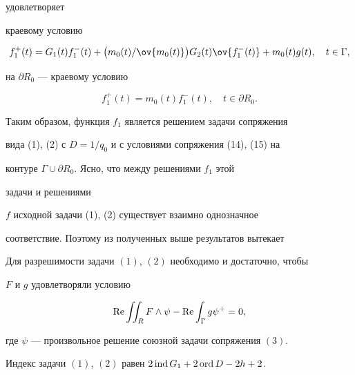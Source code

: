 удовлетворяет 


краевому условию 


\begin{equation} 


f^+_1(t)=G_1(t)f^-_1(t)+\big(m_0(t)/\ov{m_0(t)}\big) 


G_2(t)\ov{f^-_1(t)}+m_0(t)g(t),\quad t\in\Gamma, 


\end{equation} 


на $\partial R_0$ --- краевому условию 


\begin{equation} 


f^+_1(t)=m_0(t)f^-_1(t),\quad t\in\partial R_0. 


\end{equation} 


Таким образом, функция $f_1$ является решением задачи сопряжения 


вида (1), (2) с $D=1/q_0$ и с условиями сопряжения (14), (15) на 


контуре $\Gamma\cup\partial R_0$. Ясно, что между решениями $f_1$ этой 


задачи и решениями 


$f$ исходной задачи (1), (2) существует взаимно однозначное 


соответствие. Поэтому из полученных выше результатов вытекает 


 


\begin{thmnonum} 


Для разрешимости задачи $(1)$, $(2)$ необходимо и достаточно, чтобы 


$F$ и $g$ удовлетворяли условию 


$$ 


\re\iint_R F\wedge\psi-\re\int_\Gamma g\psi^+=0, 


$$ 


где $\psi$ --- произвольное решение союзной задачи сопряжения $(3)$. 


Индекс задачи $(1)$, $(2)$ равен $2\operatorname{ind} G_1+2\operatorname{ord} D-2h+2$. 


\end{thmnonum} 


 


 


